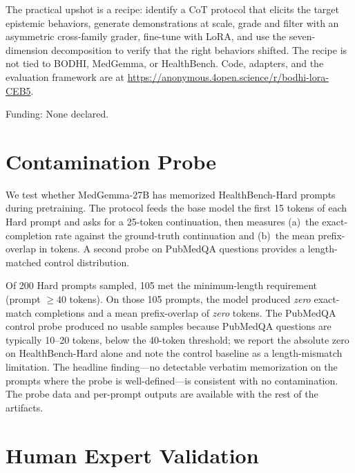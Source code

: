 \documentclass{article}
\newcommand{\bodhi}{BODHI}
\newcommand{\hbhard}{HealthBench-Hard}
\begin{document}
The practical upshot is a recipe: identify a CoT protocol that elicits the target epistemic behaviors, generate demonstrations at scale, grade and filter with an asymmetric cross-family grader, fine-tune with LoRA, and use the seven-dimension decomposition to verify that the right behaviors shifted. The recipe is not tied to \bodhi{}, MedGemma, or HealthBench. Code, adapters, and the evaluation framework are at \url{https://anonymous.4open.science/r/bodhi-lora-CEB5}.

\begin{ack}
Funding: None declared.
\end{ack}




\clearpage
\appendix
\raggedbottom

\section{Contamination Probe}
\label{app:contamination}

We test whether MedGemma-27B has memorized \hbhard{} prompts during pretraining. The protocol feeds the base model the first 15 tokens of each Hard prompt and asks for a 25-token continuation, then measures (a)~the exact-completion rate against the ground-truth continuation and (b)~the mean prefix-overlap in tokens. A second probe on PubMedQA questions provides a length-matched control distribution.

Of 200 Hard prompts sampled, 105 met the minimum-length requirement (prompt $\ge 40$ tokens). On those 105 prompts, the model produced \emph{zero} exact-match completions and a mean prefix-overlap of \emph{zero} tokens. The PubMedQA control probe produced no usable samples because PubMedQA questions are typically 10--20 tokens, below the 40-token threshold; we report the absolute zero on \hbhard{} alone and note the control baseline as a length-mismatch limitation. The headline finding---no detectable verbatim memorization on the prompts where the probe is well-defined---is consistent with no contamination. The probe data and per-prompt outputs are available with the rest of the artifacts.

\section{Human Expert Validation}
\label{app:human}
\end{document}
